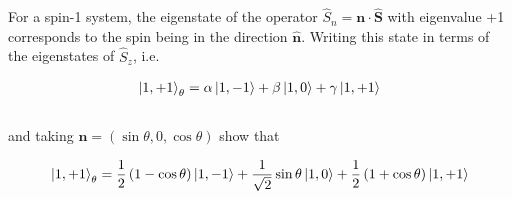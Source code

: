 \begin{problem}{6.6}
    For a spin-1 system, the eigenstate of the operator $\hat{S}_n = \mathbf{n}\cdot\hat{\mathbf{S}}$ with eigenvalue +1 
    corresponds to the spin being in the direction $\hat{\mathbf{n}}$. Writing this state in terms of the eigenstates of $\hat{S}_z$, i.e.

    \begin{align*}
        \ket{1,+1}_\theta = \alpha \ket{1,-1} + \beta \ket{1,0} + \gamma \ket{1,+1}
    \end{align*}\\
    and taking $\mathbf{n} = \left(\sin\theta,0,\cos\theta\right)$ show that

    \begin{align*}
        \ket{1,+1}_\theta = \frac{1}{2}\left(1-\cos\theta\right)\ket{1,-1} + \frac{1}{\sqrt{2}} \sin\theta \ket{1,0} + \frac{1}{2}\left(1+\cos\theta\right) \ket{1,+1}
    \end{align*}\\

\end{problem}
